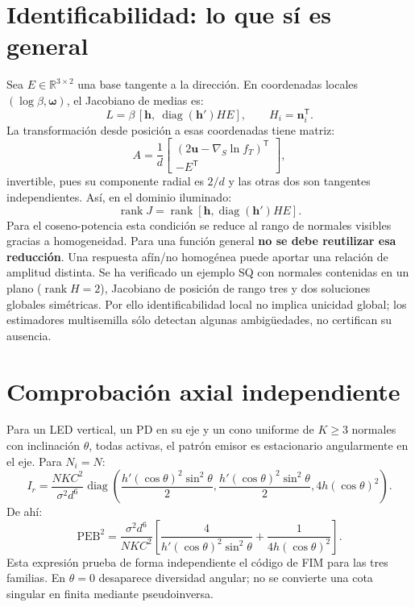 \documentclass[11pt,a4paper]{article}
\begin{document}
\section{Identificabilidad: lo que sí es general}
Sea $E\in\mathbb R^{3\times2}$ una base tangente a la dirección. En coordenadas locales $(\log\beta,\boldsymbol\omega)$, el Jacobiano de medias es:
\begin{equation}
 L=\beta\,[\mathbf h,\ \operatorname{diag}(\mathbf h')HE],\qquad H_i=\mathbf n_i^{\mathsf T}.
\end{equation}
La transformación desde posición a esas coordenadas tiene matriz:
\begin{equation}
 A=\frac1d\begin{bmatrix}(2\mathbf u-\nabla_S\ln f_T)^{\mathsf T}\\-E^{\mathsf T}\end{bmatrix},
\end{equation}
invertible, pues su componente radial es $2/d$ y las otras dos son tangentes independientes. Así, en el dominio iluminado:
\begin{equation}
 \operatorname{rank}J=\operatorname{rank}[\mathbf h,\operatorname{diag}(\mathbf h')HE].
\label{eq:rank}
\end{equation}
Para el coseno-potencia esta condición se reduce al rango de normales visibles gracias a homogeneidad. Para una función general \textbf{no se debe reutilizar esa reducción}. Una respuesta afín/no homogénea puede aportar una relación de amplitud distinta. Se ha verificado un ejemplo SQ con normales contenidas en un plano ($\operatorname{rank}H=2$), Jacobiano de posición de rango tres y dos soluciones globales simétricas. Por ello identificabilidad local no implica unicidad global; los estimadores multisemilla sólo detectan algunas ambigüedades, no certifican su ausencia.

\section{Comprobación axial independiente}
Para un LED vertical, un PD en su eje y un cono uniforme de $K\geq3$ normales con inclinación $\theta$, todas activas, el patrón emisor es estacionario angularmente en el eje. Para $N_i=N$:
\begin{equation}
 I_r=\frac{NKC^2}{\sigma^2d^6}\operatorname{diag}\left(
 \frac{h'(\cos\theta)^2\sin^2\theta}{2},
 \frac{h'(\cos\theta)^2\sin^2\theta}{2},4h(\cos\theta)^2\right).
\end{equation}
De ahí:
\begin{equation}
 \mathrm{PEB}^2=\frac{\sigma^2d^6}{NKC^2}\left[
 \frac4{h'(\cos\theta)^2\sin^2\theta}+\frac1{4h(\cos\theta)^2}\right].
\end{equation}
Esta expresión prueba de forma independiente el código de FIM para las tres familias. En $\theta=0$ desaparece diversidad angular; no se convierte una cota singular en finita mediante pseudoinversa.
\end{document}
